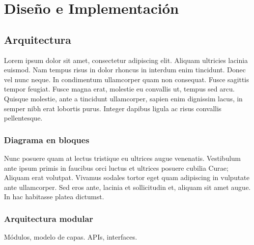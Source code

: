 
\chapter{Diseño e Implementación} %

\label{Chapter3} %


\section{Arquitectura}

Lorem ipsum dolor sit amet, consectetur adipiscing elit. Aliquam ultricies lacinia euismod. Nam tempus risus in dolor rhoncus in interdum enim tincidunt. Donec vel nunc neque. In condimentum ullamcorper quam non consequat. Fusce sagittis tempor feugiat. Fusce magna erat, molestie eu convallis ut, tempus sed arcu. Quisque molestie, ante a tincidunt ullamcorper, sapien enim dignissim lacus, in semper nibh erat lobortis purus. Integer dapibus ligula ac risus convallis pellentesque.

\subsection{Diagrama en bloques}

Nunc posuere quam at lectus tristique eu ultrices augue venenatis. Vestibulum ante ipsum primis in faucibus orci luctus et ultrices posuere cubilia Curae; Aliquam erat volutpat. Vivamus sodales tortor eget quam adipiscing in vulputate ante ullamcorper. Sed eros ante, lacinia et sollicitudin et, aliquam sit amet augue. In hac habitasse platea dictumst.


\subsection{Arquitectura modular}

Módulos, modelo de capas. APIs, interfaces.



